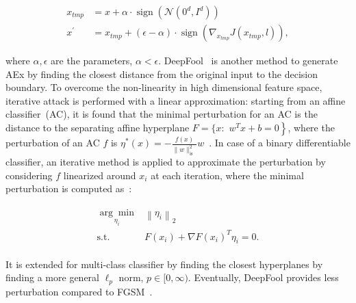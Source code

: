 \vspace{-6mm}
\begin{align}
    x_{t m p} &=x+\alpha \cdot \operatorname{sign}\left(\mathcal{N}\left({0}^{d}, {I}^{d}\right)\right) \\
    x^{\prime} &=x_{t m p}+(\epsilon-\alpha) \cdot \operatorname{sign}\left(\nabla_{x_{t m p}} J\left(x_{t m p}, l\right)\right),
\end{align}
    
\hspace*{3.5mm} where $\alpha, \epsilon$ are the parameters, $\alpha<\epsilon$.  DeepFool~\cite{moosavi2016deepfool} is another method to generate AEx by finding the closest distance from the original input to the decision boundary. To overcome the non-linearity in high dimensional feature space, iterative attack is performed with a linear approximation: starting from an affine classifier~(AC), it is found that the minimal perturbation for an AC is the distance to the separating affine hyperplane ${F}=\{x:$ $\left.w^{T} x+b=0\right\}$, where the perturbation of an AC $f$ is $\eta^{*}(x)=-\frac{f(x)}{\|w\|_{\text {is }}^{2}} w$~\cite{yuan2019adversarial}. In case of a binary differentiable classifier, an iterative method is applied to approximate the perturbation by considering $f$ linearized around $x_{i}$ at each iteration, where the minimal perturbation is computed as~\cite{yuan2019adversarial}:
 
\vspace{-6mm}
\begin{align}
    \begin{array}{ll}
    \underset{\eta_{i}}{\arg \min } & \left\|\eta_{i}\right\|_{2} \\
    \text {s.t.} & F\left(x_{i}\right)+\nabla F\left(x_{i}\right)^{T} \eta_{i}=0.
    \end{array}
\end{align}

\hspace*{3.5mm} It is extended for multi-class classifier by finding the closest hyperplanes by finding a more general $\ell_{p}$ norm, $p \in[0, \infty)$. Eventually, DeepFool provides less perturbation compared to FGSM~\cite{yuan2019adversarial}.


